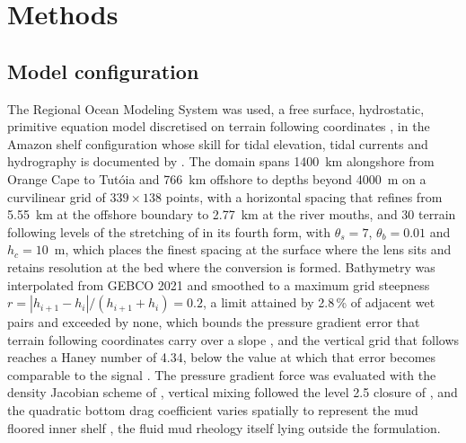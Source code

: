 \documentclass[a4paper,fleqn]{cas-sc}
\begin{document}
\section{Methods}

\subsection{Model configuration}
\label{sec:model}

The Regional Ocean Modeling System was used, a free surface, hydrostatic, primitive equation model discretised on terrain following coordinates \citep{shchepetkin2005regional,haidvogel1991semi}, in the Amazon shelf configuration whose skill for tidal elevation, tidal currents and hydrography is documented by \citet{nascimento:2026}. The domain spans 1400~km alongshore from Orange Cape to Tut\'oia and 766~km offshore to depths beyond 4000~m on a curvilinear grid of $339\times138$ points, with a horizontal spacing that refines from 5.55~km at the offshore boundary to 2.77~km at the river mouths, and 30 terrain following levels of the stretching of \citet{shchepetkin2005regional} in its fourth form, with $\theta_{s}=7$, $\theta_{b}=0.01$ and $h_{c}=10$~m, which places the finest spacing at the surface where the lens sits and retains resolution at the bed where the conversion is formed. Bathymetry was interpolated from GEBCO 2021 \citep{gebco2021} and smoothed to a maximum grid steepness $r=|h_{i+1}-h_{i}|/(h_{i+1}+h_{i})=0.2$, a limit attained by 2.8\,\% of adjacent wet pairs and exceeded by none, which bounds the pressure gradient error that terrain following coordinates carry over a slope \citep{beckmann:1993,haney:1991}, and the vertical grid that follows reaches a Haney number of 4.34, below the value at which that error becomes comparable to the signal \citep{haney:1991,mellor:1994}. The pressure gradient force was evaluated with the density Jacobian scheme of \citet{shchepetkin:2003}, vertical mixing followed the level 2.5 closure of \citet{mellor:1974}, and the quadratic bottom drag coefficient varies spatially to represent the mud floored inner shelf \citep{fontes:2008}, the fluid mud rheology itself lying outside the formulation.
\end{document}
